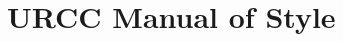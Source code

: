 \documentclass[12pt]{article}
\begin{document}







\section{URCC Manual of Style}
\end{document}
